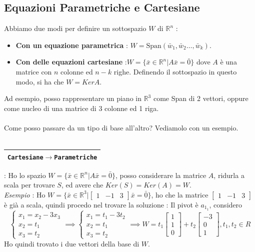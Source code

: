 \documentclass[12pt, letterpaper]{article}
\newcommand{\R}{{\mathbb R}}
\newcommand{\acc}{\\\hphantom{}\\}
\newcommand{\Span}{{\text{Span}}}
\newcommand{\boxedMath}[1]{\begin{tabular}{|c|}\hline \texttt{#1} \\ \hline\end{tabular} :}
\begin{document}
\subsection{Equazioni Parametriche e Cartesiane}
 Abbiamo due modi per definire un sottospazio \(W\) di \(\R^n\) : \begin{itemize}
    \item \textbf{Con un equazione parametrica} : \(W=\Span(\bar w_1,\bar w_2\dots,\bar w_k)\).
    \item \textbf{Con delle equazioni cartesiane} :\(W=\{\bar x \in \R^n|A\bar x=\bar 0\}\) dove \(A\) è una matrice con \(n\) colonne ed \(n-k\) righe. Definendo il 
    sottospazio in questo 
    modo, si ha che \(W=KerA\).
 \end{itemize}
 Ad esempio, posso rappresentare un piano in \( \R^3\) come Span di 2 vettori, oppure come nucleo di una matrice 
di 3 colonne ed 1 riga.\acc Come posso passare da un tipo di base all'altro? Vediamolo con un esempio.\acc 
\boxedMath{Cartesiane\(\rightarrow\)Parametriche} Ho lo spazio \(W=\{\bar x \in \R^n|A\bar x=\bar 0\}\), posso considerare 
la matrice \(A\), ridurla a scala per trovare \(S\), ed avere che \(Ker(S)=Ker(A)=W\).\\ \textit{Esempio }: 
Ho \(W=\{\bar x \in \R^3|\begin{bmatrix}1&-1&3\end{bmatrix}\bar x=\bar 0\}\), ho che la matrice 
\(\begin{bmatrix}1&-1&3\end{bmatrix}\) è già a scala, quindi procedo nel trovare la soluzione : Il pivot è \(a_{1_1}\),
considero $$\begin{cases}
    x_1=x_2-3x_3\\x_2=t_1\\x_3=t_2
\end{cases}\implies \begin{cases}
    x_1=t_1-3t_2\\x_2=t_1\\x_3=t_2
\end{cases}\implies W=t_1\begin{bmatrix}
    1\\1\\0
\end{bmatrix}+t_2\begin{bmatrix}
    -3\\0\\1
\end{bmatrix}, t_1,t_2\in R$$
Ho quindi trovato i due vettori della base di \(W\).\acc 
\end{document}
